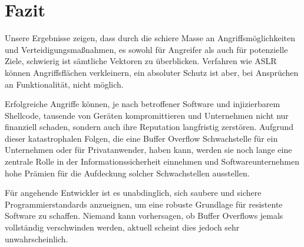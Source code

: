\pagebreak

\section{Fazit}
Unsere Ergebnisse zeigen, dass durch die schiere Masse an Angriffsmöglichkeiten und Verteidigungsmaßnahmen, 
es sowohl für Angreifer als auch für potenzielle Ziele, schwierig ist sämtliche Vektoren zu überblicken. 
Verfahren wie ASLR können Angriffsflächen verkleinern, ein absoluter Schutz ist aber, bei Ansprüchen an Funktionalität, nicht möglich.

Erfolgreiche Angriffe können, je nach betroffener Software und injizierbarem Shellcode, tausende von Geräten kompromittieren und
Unternehmen nicht nur finanziell schaden, sondern auch ihre Reputation langfristig zerstören. 
Aufgrund dieser katastrophalen Folgen, die eine Buffer Overflow Schwachstelle für ein Unternehmen oder für Privatanwender, 
haben kann, werden sie noch lange eine zentrale Rolle in der Informationssicherheit einnehmen und 
Softwareunternehmen hohe Prämien für die Aufdeckung solcher Schwachstellen ausstellen. 

Für angehende Entwickler ist es unabdinglich, sich saubere und sichere Programmierstandards anzueignen, um eine robuste Grundlage für resistente Software zu schaffen. 
Niemand kann vorhersagen, ob Buffer Overflows jemals vollständig verschwinden werden, aktuell scheint dies jedoch sehr unwahrscheinlich.




















